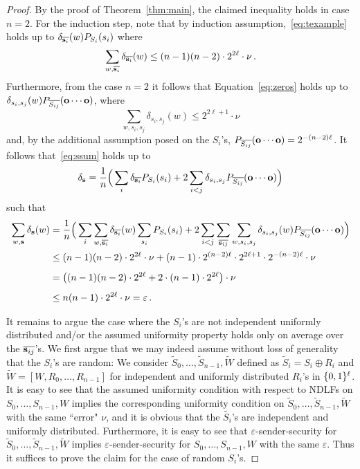 \begin{proof}
By the proof of Theorem~\ref{thm:main}, the claimed inequality holds in case $n = 2$. For the induction step, note that by induction assumption,~\eqref{eq:texample} holds up to $\delta_{\overline{\text{\boldmath${\bf s}$}_i}}(w) P_{S_i}(s_i)$ where 
$$
\sum_{w,\overline{\text{\boldmath${\bf s}$}_i}} \delta_{\overline{\text{\boldmath${\bf s}$}_i}}(w) \leq (n-1)(n-2)\cdot2^{2\ell} \cdot \nu \, .
$$
Furthermore, from the case $n=2$ it follows that Equation~\eqref{eq:zeros} holds up to $\delta_{s_i,s_j}(w) P_{\overline{S_{ij}}}(\text{\boldmath${\bf o}$}\cdots\text{\boldmath${\bf o}$})$, where 
$$
\sum_{w,s_i,s_j} \delta_{s_i,s_j}(w) \leq 2^{2\ell+1}\cdot\nu
$$ 
and, by the additional assumption posed on the $S_i$'s, $P_{\overline{S_{ij}}}(\text{\boldmath${\bf o}$}\cdots\text{\boldmath${\bf o}$}) = 2^{-(n-2)\ell}
$.
It follows that~\eqref{eq:ssum} holds up to 
$$
\delta_{\text{\boldmath${\bf s}$}} = \frac{1}{n}\Big(\sum_i\delta_{\overline{\text{\boldmath${\bf s}$}_i}}P_{S_i}(s_i)+2\sum_{i<j}\delta_{s_i,s_j}P_{\overline{S_{ij}}}(\text{\boldmath${\bf o}$}\cdots\text{\boldmath${\bf o}$})\Big)
$$ 
such that 
\begin{align*}
\sum_{w,\text{\boldmath${\bf s}$}} \delta_{\text{\boldmath${\bf s}$}}(w) &= \frac{1}{n}\Big( \sum_i \sum_{w,\overline{\text{\boldmath${\bf s}$}_i}}\delta_{\overline{\text{\boldmath${\bf s}$}_i}}(w) \sum_{s_i}P_{S_i}(s_i) + 2\sum_{i<j} \sum_{\overline{\text{\boldmath${\bf s}$}_{ij}}}\sum_{w,s_i,s_j}\delta_{s_i,s_j}(w) P_{\overline{S_{ij}}}(\text{\boldmath${\bf o}$}\cdots\text{\boldmath${\bf o}$}) \Big) \\
&\leq (n-1)(n-2)\cdot2^{2\ell} \cdot \nu + (n-1) \cdot 2^{(n-2)\ell} \cdot 2^{2\ell+1} \cdot 2^{-(n-2)\ell} \cdot \nu \\[1ex]
&= \big( (n-1)(n-2) \cdot2^{2\ell} + 2\cdot (n-1) \cdot 2^{2\ell} \big) \cdot \nu \\[1ex]
&\leq n(n-1) \cdot 2^{2\ell} \cdot \nu = \varepsilon \, .
\end{align*}

It remains to argue the case where the $S_i$'s are not independent
uniformly distributed and/or the assumed uniformity property holds
only on average over the $\overline{\text{\boldmath${\bf s}$}_{ij}}$'s.  We first argue
that we may indeed assume without loss of generality that the $S_i$'s
are random: We consider $\tilde{S}_0,\ldots,\tilde{S}_{n-1},\tilde{W}$
defined as $\tilde{S}_i = S_i \oplus R_i$ and $\tilde{W} =
[W,R_0,\ldots,R_{n-1}]$ for independent and uniformly distributed
$R_i$'s in $\{0,1\}^{\ell}$.  It is easy to see that the assumed
uniformity condition with respect to 
NDLFs on $S_0,\ldots,S_{n-1},W$
implies the corresponding uniformity condition on
$\tilde{S}_0,\ldots,\tilde{S}_{n-1},\tilde{W}$ with the same ``error"
$\nu$, and it is obvious that the $\tilde{S_i}$'s are independent and
uniformly distributed.  Furthermore, it is easy to see that
$\varepsilon$-sender-security for
$\tilde{S}_0,\ldots,\tilde{S}_{n-1},\tilde{W}$ implies
$\varepsilon$-sender-security for $S_0,\ldots,S_{n-1},W$ with the same
$\varepsilon$. Thus it suffices to prove the claim for the case of
random $S_i$'s.


\end{proof}
